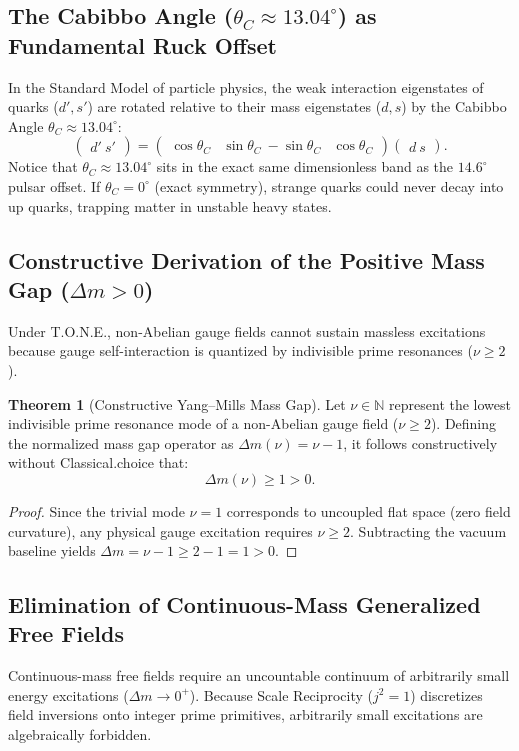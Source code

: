 \documentclass[11pt,a4paper,oneside]{article}
\def\texttt#1{#1}%
\theoremstyle{definition}
\newtheorem{theorem}{Theorem}[section]
\begin{document}
\subsection{The Cabibbo Angle ($\theta_C \approx 13.04^\circ$) as Fundamental Ruck Offset}
In the Standard Model of particle physics, the weak interaction eigenstates of quarks ($d', s'$) are rotated relative to their mass eigenstates ($d, s$) by the Cabibbo Angle $\theta_C \approx 13.04^\circ$:
\begin{equation}
\begin{pmatrix} d' \ s' \end{pmatrix} = \begin{pmatrix} \cos\theta_C & \sin\theta_C \ -\sin\theta_C & \cos\theta_C \end{pmatrix} \begin{pmatrix} d \ s \end{pmatrix}.
\end{equation}
Notice that $\theta_C \approx 13.04^\circ$ sits in the exact same dimensionless band as the $14.6^\circ$ pulsar offset. If $\theta_C = 0^\circ$ (exact symmetry), strange quarks could never decay into up quarks, trapping matter in unstable heavy states.
\subsection{Constructive Derivation of the Positive Mass Gap ($\Delta m > 0$)}
Under T.O.N.E., non-Abelian gauge fields cannot sustain massless excitations because gauge self-interaction is quantized by indivisible prime resonances ($\nu \ge 2$).
\begin{theorem}[Constructive Yang–Mills Mass Gap]
Let $\nu \in \mathbb{N}$ represent the lowest indivisible prime resonance mode of a non-Abelian gauge field ($\nu \ge 2$). Defining the normalized mass gap operator as $\Delta m(\nu) = \nu - 1$, it follows constructively without \texttt{Classical.choice} that:
\begin{equation}
\Delta m(\nu) \ge 1 > 0.
\end{equation}
\end{theorem}
\begin{proof}
Since the trivial mode $\nu = 1$ corresponds to uncoupled flat space (zero field curvature), any physical gauge excitation requires $\nu \ge 2$. Subtracting the vacuum baseline yields $\Delta m = \nu - 1 \ge 2 - 1 = 1 > 0$.
\end{proof}
\subsection{Elimination of Continuous-Mass Generalized Free Fields}
Continuous-mass free fields require an uncountable continuum of arbitrarily small energy excitations ($\Delta m \to 0^+$). Because Scale Reciprocity ($j^2 = 1$) discretizes field inversions onto integer prime primitives, arbitrarily small excitations are algebraically forbidden.
\end{document}
